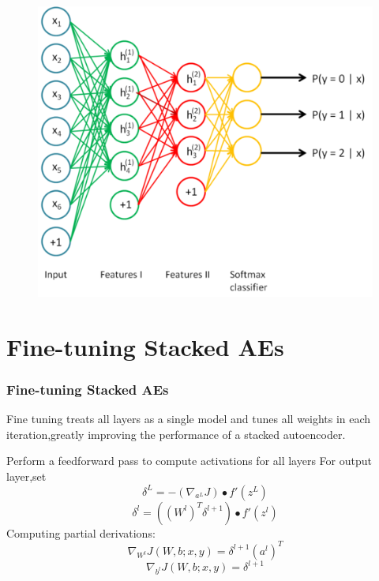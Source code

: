 \documentclass{beamer}
\begin{document}
\begin{CJK*}{UTF8}{gbsn}
\begin{frame}[allowframebreaks]
\begin{figure}
\centering
\includegraphics[scale=0.65]{images/Stacked_Combined}
\end{figure}
\end{frame}


\section{Fine-tuning Stacked AEs}
\begin{frame}\frametitle{Fine-tuning Stacked AEs}
Fine tuning treats all layers as a single model and tunes all weights in each iteration,greatly improving the performance of a stacked autoencoder.
\begin{algorithm}[H]
Perform a feedforward pass to compute activations for all layers\;
For output layer,set
\begin{equation}
\delta^L=-(\nabla_{a^L}J)\bullet f'(z^L)
\end{equation}
{
\begin{equation}
\delta^l=((W^l)^T\delta^{l+1})\bullet f'(z^l)
\end{equation}
}
Computing partial derivations:
\begin{equation}
\nabla_{W^l}J(W,b;x,y)=\delta^{l+1}(a^l)^T
\end{equation}
\begin{equation}
\nabla_{b^l}J(W,b;x,y)=\delta^{l+1}
\end{equation}
\end{algorithm}
\end{frame}


\end{CJK*}
\end{document}
